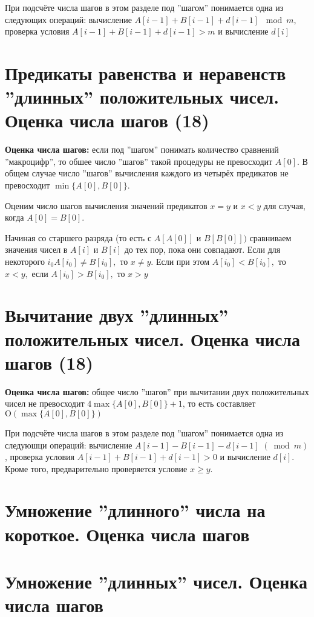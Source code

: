 \documentclass[40pt]{article}
\begin{document}
При подсчёте числа шагов в этом разделе под ''шагом'' понимается одна из следующих операций: вычисление $A[i-1]+B[i-1]+d[i-1]$ $\bmod m$, проверка условия $A[i-1]+B[i-1]+d[i-1]>m$ и вычисление $d[i]$


\section{Предикаты равенства и неравенств ''длинных'' положительных чисел. Оценка числа шагов (18)}

\textbf{Оценка числа шагов:} если под ''шагом'' понимать количество сравнений ''макроцифр'', то обшее число ''шагов'' такой процедуры не превосходит $A[0]$. В общем случае число ''шагов'' вычисления каждого из четырёх предикатов не превосходит $\min \{A[0], B[0]\}$.


Оценим число шагов вычисления значений предикатов $x=y$ и $x<y$ для случая, когда $A[0]=B[0]$.

Начиная со старшего разряда (то есть с $A[A[0]]$ и $B[B[0]])$ сравниваем значения чисел в $A[i]$ и $B[i]$ до тех пор, пока они совпадают. Если для некоторого $i_{0} A\left[i_{0}\right] \neq B\left[i_{0}\right],$ то $x \neq y .$ Если при этом $A\left[i_{0}\right]<B\left[i_{0}\right],$ то $x<y,$ если $A\left[i_{0}\right]>B\left[i_{0}\right],$ то $x>y$


\section{Вычитание двух ''длинных'' положительных чисел. Оценка числа шагов (18)}

\textbf{Оценка числа шагов:} общее число  ''шагов'' при вычитании двух положительных чисел не превосходит $4 \max \{A[0], B[0]\}+1$, то есть составляет $\mathrm{O}(\max \{A[0], B[0]\})$

При подсчёте числа шагов в этом разделе под ''шагом'' понимается одна из следуюшци операций: вычисление $A[i-1]-B[i-1]-d[i-1]$ $(\bmod m)$, проверка условия $A[i-1]+B[i-1]+d[i-1]>0$ и вычисление $d[i]$. Кроме того, предварительно проверяется условие $x \geq y$.




\section{Умножение ''длинного'' числа на короткое. Оценка числа шагов}
\section{Умножение ''длинных'' чисел. Оценка числа шагов}
\end{document}
